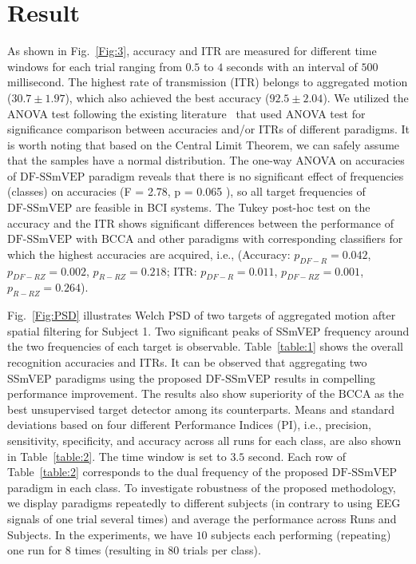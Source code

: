 \documentclass[sensors,accept,moreauthors,pdftex,10pt,a4paper]{mdpi}
\def\DFS{\text{DF-SSmVEP}} %
\def\DCCA{\text{BCCA}}
\theoremstyle{mdpi}
\newcounter{ex}
\newcounter{re}
\theoremstyle{mdpidefinition}
\begin{document}
\section{Result}
As shown in Fig.~\ref{Fig:3}, accuracy and ITR are measured for different time windows for each trial ranging from $0.5$ to $4$ seconds with an interval of $500$ millisecond. The highest rate of transmission (ITR) belongs to aggregated motion ($30.7\pm1.97$), which also achieved the best accuracy ($92.5\pm2.04$). We utilized the ANOVA test  following the existing literature~\cite{yan2017four,han2018highly} that used ANOVA test for significance comparison between accuracies and/or ITRs of different paradigms. It is worth noting that based on the Central Limit Theorem, we can safely assume that the samples have a normal distribution.  The one-way ANOVA on accuracies of $\DFS$ paradigm reveals that there is no significant effect of frequencies (classes) on accuracies (F = 2.78, p = 0.065 ), so all target frequencies of $\DFS$ are feasible in BCI systems. The Tukey post-hoc test on the accuracy and the ITR shows significant differences  between the performance of $\DFS$ with $\DCCA$ and other paradigms with corresponding classifiers for which the highest accuracies are acquired, i.e., (Accuracy: $p_{DF-R} = 0.042$, $p_{DF-RZ}=0.002$, $p_{R-RZ} = 0.218$; ITR: $p_{DF-R} = 0.011$, $p_{DF-RZ}=0.001$, $p_{R-RZ} = 0.264$).

Fig.~\ref{Fig:PSD} illustrates Welch PSD of two targets of aggregated motion after spatial filtering for Subject 1. Two significant peaks of SSmVEP frequency around the two   frequencies of each target is observable. Table~\ref{table:1} shows the overall recognition accuracies and ITRs. It can be observed that aggregating  two SSmVEP paradigms using the proposed $\DFS$ results in compelling performance improvement. The results also show superiority of the $\DCCA$ as the best unsupervised target detector among its counterparts. Means and standard deviations based on four different Performance Indices (PI), i.e., precision, sensitivity, specificity, and accuracy across all runs for each class, are also shown in Table~\ref{table:2}. The time window is set to $3.5$ second. Each row of Table~\ref{table:2} corresponds to the dual frequency of the proposed $\DFS$ paradigm in each class. To investigate robustness of the proposed methodology, we display paradigms repeatedly to different subjects (in contrary to using EEG signals of one trial several times) and average the performance across Runs and Subjects. In the experiments, we have $10$ subjects each performing (repeating) one run for $8$ times (resulting in 80 trials per class).
\end{document}
